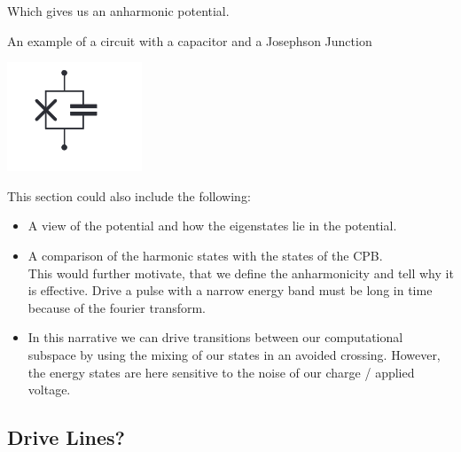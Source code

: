 Which gives us an anharmonic potential.

\begin{marginfigure}
    \caption{An example of a circuit with a capacitor and a Josephson Junction}
    \includegraphics[width = \textwidth]{tex/fig_for_text/CooperPairIsland.png}
    \label{fig:cooper_pair_island}
\end{marginfigure}
\vspace{1 cm}
This section could also include the following:
\begin{itemize}
    \item A view of the potential and how the eigenstates lie in the potential.
    \item A comparison of the harmonic states with the states of the CPB. \\
    This would further motivate, that we define the anharmonicity and tell why it is effective. Drive a pulse with a narrow energy band must be long in time because of the fourier transform. \\
    \item In this narrative we can drive transitions between our computational subspace by using the mixing of our states in an avoided crossing. However, the energy states are here sensitive to the noise of our charge / applied voltage. 
\end{itemize}

\subsection{Drive Lines?}



